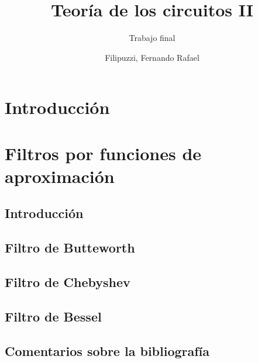 \documentclass[oneside,a4paper,10pt]{scrbook}
\begin{document}
	\pagestyle{fancy}
	
	\fancyhead{}\fancyfoot{}

	
	\rfoot{ \thepage \hspace{1pt} - \pageref{LastPage}}
	
	\title{Teoría de los circuitos II}
	\subtitle{Trabajo final}
	\author{Filipuzzi, Fernando Rafael	}
	
	
	\maketitle
	
	\tableofcontents
	
	\listoffigures\newpage
   
	\chapter{Introducción}
	{
		
	}
	
	\clearpage
   
	\chapter{Filtros por funciones de aproximación}
	{
		\section{Introducción}
   		{
    					
		}
		
		\clearpage
		
    	\section{Filtro de Butteworth}
   		{
    							
		}
		
		\clearpage
		
		\section[]{Filtro de Chebyshev}
   		{
    			
		}
		
		\clearpage
		
		\section{Filtro de Bessel}
   		{
    				
		}
		
		\clearpage
		
		\section{Comentarios sobre la bibliografía}
   		{
    						
		}
	}
	
\end{document}
